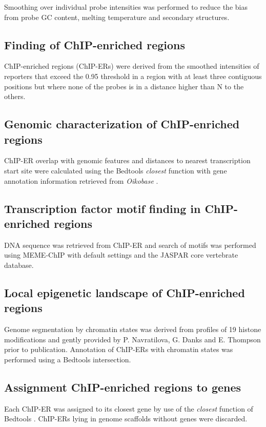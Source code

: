 \documentclass[11pt,twoside,a4paper]{report}
\begin{document}
			Smoothing over individual probe intensities was performed to reduce the bias from probe GC content, melting temperature and secondary structures.
		
		\subsection{Finding of ChIP-enriched regions}
		\label{subsection:methods_find_ChIP-ER}
			ChIP-enriched regions (ChIP-ERs) were derived from the smoothed intensities of reporters that exceed the 0.95 threshold in a region with at least three contiguous positions but where none of the probes is in a distance higher than N to the others.
		
		\subsection{Genomic characterization of ChIP-enriched regions}
			ChIP-ER overlap with genomic features and distances to nearest transcription start site were calculated using the Bedtools \cite{Quinlan2010} \textit{closest} function with gene annotation information retrieved from \textit{Oikobase} \cite{Danks2013}.
			
		\subsection{Transcription factor motif finding in ChIP-enriched regions}
			DNA sequence was retrieved from ChIP-ER and search of motifs was performed using MEME-ChIP \cite{Machanick2011} with default settings and the JASPAR core vertebrate database.
		
		\subsection{Local epigenetic landscape of ChIP-enriched regions}
			Genome segmentation by chromatin states was derived from profiles of 19 histone modifications and gently provided by P. Navratilova, G. Danks and E. Thompson prior to publication. Annotation of ChIP-ERs with chromatin states was performed using a Bedtools \cite{Quinlan2010} intersection.
			
		\subsection{Assignment ChIP-enriched regions to genes}
			Each ChIP-ER was assigned to its closest gene by use of the \textit{closest} function of Bedtools \cite{Quinlan2010}. ChIP-ERs lying in genome scaffolds without genes were discarded.			
\end{document}
